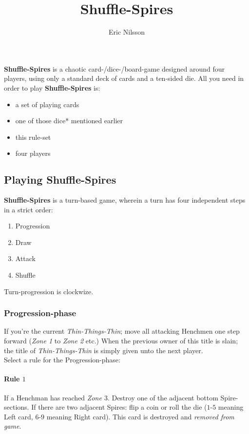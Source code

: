 \documentclass[11pt,twocolumn]{article}
\title{Shuffle-Spires}
\author{Eric Nilsson}
\date{}
\begin{document}
\maketitle

\noindent
\textbf{Shuffle-Spires} is a chaotic card-/dice-/board-game designed around four players, using only a standard deck of cards and a ten-sided die.
All you need in order to play \textbf{Shuffle-Spires} is:
\begin{itemize}[noitemsep]
\renewcommand{\labelitemi}{$\bullet$}
\item a set of playing cards
\item one of those dice* mentioned earlier
\item this rule-set
\item four players
\end{itemize}




\subsection{Playing Shuffle-Spires}
\label{sec:playingshufflespires}
\textbf{Shuffle-Spires} is a turn-based game, wherein a turn has four independent steps in a strict order:
\begin{enumerate}[noitemsep]
\item  Progression
\item Draw
\item Attack
\item Shuffle
\end{enumerate}
Turn-progression is clockwize.

\subsubsection{Progression-phase}
\label{sec:playingshufflespires_progressionphase}
If you’re the current \textit{Thin-Things-Thin}; move all attacking Henchmen one step forward (\textit{Zone 1} to \textit{Zone 2} etc.)
When the previous owner of this title is slain; the title of \textit{Thin-Things-Thin} is simply given unto the next player.\\

\noindent
Select a rule for the Progression-phase:

\paragraph{Rule $1$}
If a Henchman has reached \textit{Zone $3$}. Destroy one of the adjacent bottom Spire-sections.
If there are two adjacent Spires: flip a coin or roll the die ($1$-$5$ meaning Left card, $6$-$9$ meaning Right card).
This card is destroyed and \textit{removed from game}.
\end{document}
